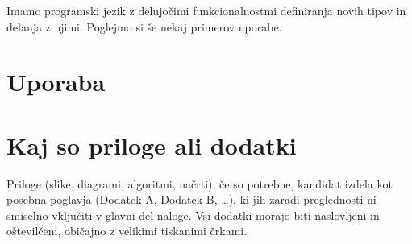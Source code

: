 \documentclass[12pt,a4paper,openany]{book}
\begin{document}
Imamo programski jezik z delujočimi funkcionalnostmi definiranja novih tipov in delanja z njimi. Poglejmo si še nekaj primerov uporabe.

\chapter{Uporaba}


\newpage


\appendix


\chapter{Kaj so priloge ali dodatki}

Priloge (slike, diagrami, algoritmi, načrti), 
če so potrebne, kandidat izdela kot posebna poglavja (Dodatek A, Dodatek B, \ldots), ki jih zaradi preglednosti ni smiselno vključiti v glavni
del naloge. Vsi dodatki morajo biti naslovljeni in oštevilčeni, običajno z velikimi tiskanimi črkami. 

\newpage

\listoffigures

\newpage

\listoftables




\newpage


\label{stran_literatura}
 
\end{document}
